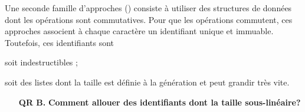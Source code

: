 \begin{itemize}
  Une seconde famille d'approches (\REF) consiste à utiliser des structures de
  données dont les opérations sont commutatives. Pour que les opérations
  commutent, ces approches associent à chaque caractère un identifiant unique et
  immuable. Toutefois, ces identifiants sont
  \begin{inparaenum}[(i)]
  \item soit indestructibles ;
  \item soit des listes dont la taille est définie à la génération et peut
    grandir très vite. 
  \end{inparaenum}

  \begin{itemize}
  \item [\textbf{QR B.}] \textbf{Comment allouer des identifiants dont la taille
      sous-linéaire?}
  \end{itemize}

\end{itemize}

